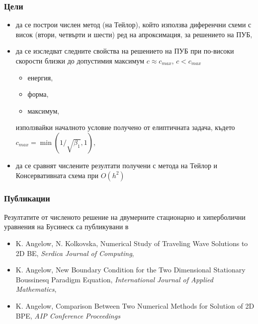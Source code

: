 \documentclass{beamer}
\begin{document}

\begin{frame}
\frametitle{Цели}

\begin{itemize}
  \item да се построи числен метод (на Тейлор), който използва диференчни схеми с висок (втори, четвърти и шести) ред на апроксимация, за решението на ПУБ,
  
     \item да се изследват следните свойства на решението на ПУБ при по-високи скорости близки до допустимия максимум $c \approx c_{max}$, $c < c_{max}$
  \begin{itemize}
     \item енергия,
     \item форма,
     \item максимум,     
  \end{itemize}
	използвайки началното условие получено от елиптичната задача, където $c_{max} = \min (1/ \sqrt{\beta_1},1)$,

  \item да се сравнят числените резултати получени с метода на Тейлор и Консервативната схема при $O(h^2)$
    
\end{itemize}


\end{frame}


\begin{frame}
\frametitle{Публикации}

Резултатите от численото решение на двумерните стационарно и хиперболични уравнения на Бусинеск са
публикувани в
\begin{itemize}
  \item K. Angelow, N. Kolkovska, Numerical Study of Traveling Wave Solutions to 2D BE, {\it Serdica Journal of Computing},
  \item K. Angelow, New Boundary Condition for the Two Dimensional Stationary Boussinesq Paradigm Equation, {\it International Journal of Applied Mathematics},
   \item K. Angelow, Comparison Between Two Numerical Methods for Solution of 2D BPE, {\it AIP Conference Proceedings}
\end{itemize}

\end{frame}

\end{document}
